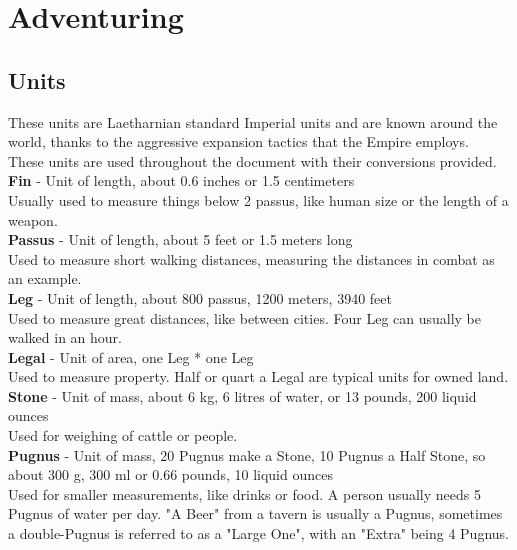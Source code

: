 \chapter{Adventuring}
\section{Units}
These units are Laetharnian standard Imperial units and are known around the world, thanks to the aggressive expansion tactics that the Empire employs.\\
These units are used throughout the document with their conversions provided.\\


\textbf{Fin} - Unit of length, about 0.6 inches or 1.5 centimeters\\
Usually used to measure things below 2 passus, like human size or the length of a weapon.\\


\textbf{Passus} - Unit of length, about 5 feet or 1.5 meters long\\
Used to measure short walking distances, measuring the distances in combat as an example.\\


\textbf{Leg} - Unit of length, about 800 passus, 1200 meters, 3940 feet\\
Used to measure great distances, like between cities. Four Leg can usually be walked in an hour.\\


\textbf{Legal} - Unit of area, one Leg * one Leg\\
Used to measure property. Half or quart a Legal are typical units for owned land.\\


\textbf{Stone} - Unit of mass, about 6 kg, 6 litres of water, or 13 pounds, 200 liquid ounces\\
Used for weighing of cattle or people.\\


\textbf{Pugnus} - Unit of mass, 20 Pugnus make a Stone, 10 Pugnus a Half Stone, so about 300 g, 300 ml or 0.66 pounds, 10 liquid ounces\\
Used for smaller measurements, like drinks or food. A person usually needs 5 Pugnus of water per day. "A Beer" from a tavern is usually a Pugnus, sometimes a double-Pugnus is referred to as a  "Large One", with an "Extra" being 4 Pugnus.\\


